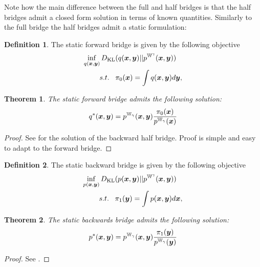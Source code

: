 \documentclass[a4paper,12pt,twoside,openright]{report}
\newtheorem{theorem}{Theorem}
\theoremstyle{definition}
\newtheorem{definition}{Definition}[section]
\begin{document}
Note how the main difference between the full and half bridges is that the half bridges admit a closed form solution in terms of known quantities. Similarly to the full bridge the half bridges admit a static formulation:

\begin{definition}
The static forward bridge is given by the following objective
 \begin{align}\label{eq:static_bridge_forward}
        \inf_{q({\bm{x}},{\bm{y}})} D_{\mathrm{KL}}  &(q({\bm{x}},{\bm{y}}) || p^{\mathbb{W}^{\gamma}}({\bm{x}},{\bm{y}})) \nonumber \\
        s.t. \;\;\;& \pi_0({\bm{x}}) = \int q({\bm{x}},{\bm{y}}) d{\bm{y}}, 
\end{align}
\end{definition}
\begin{theorem}\label{thrm:static_half_forward}
     The static forward bridge admits the following solution:
     \begin{align}
         q^{*}({\bm{x}},{\bm{y}}) = p^{\mathbb{W}_{\gamma}}({\bm{x}}, {\bm{y}})\frac{\pi_0({\bm{x}})}{p^{\mathbb{W}_{\gamma}}({\bm{x}})}
     \end{align}
\end{theorem}
\begin{proof}
See \cite{pavon2018data} for the solution of the backward half bridge. Proof is simple and easy to adapt to the forward bridge. 
\end{proof}
\begin{definition}
The static backward bridge is given by the following objective
 \begin{align}\label{eq:static_bridge_backward}
        \inf_{p({\bm{x}},{\bm{y}})} D_{\mathrm{KL}}  &(p({\bm{x}},{\bm{y}}) || p^{\mathbb{W}^{\gamma}}({\bm{x}},{\bm{y}})) \nonumber \\
        s.t. \;\;\;& \pi_1({\bm{y}}) = \int p({\bm{x}},{\bm{y}}) d{\bm{x}}, 
\end{align}
\end{definition}
\begin{theorem}\label{thrm:static_half_backward}
     The static backwards bridge admits the following solution:
     \begin{align}
         p^{*}({\bm{x}},{\bm{y}}) = p^{\mathbb{W}_{\gamma}}({\bm{x}}, {\bm{y}})\frac{\pi_1({\bm{y}})}{p^{\mathbb{W}_{\gamma}}({\bm{y}})}
     \end{align}
\end{theorem}
\begin{proof}
See \cite{pavon2018data}.
\end{proof}


\end{document}
